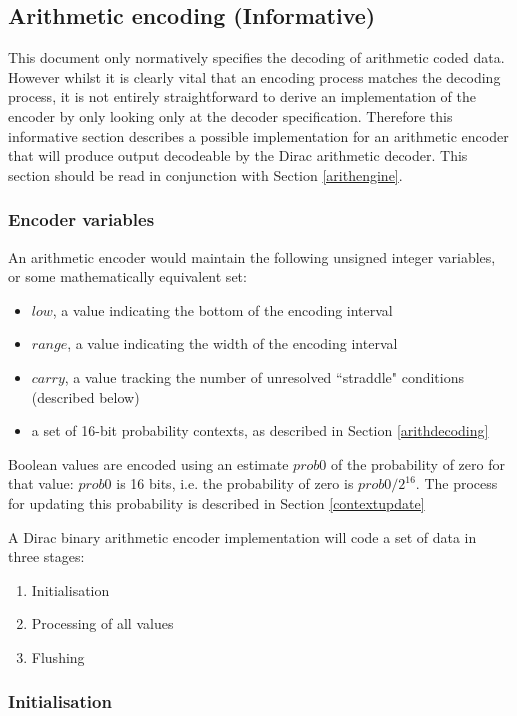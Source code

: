 \begin{informative*}
\subsection{Arithmetic encoding (Informative)}

This document only normatively specifies the decoding of arithmetic coded data. 
However whilst it is clearly vital that an encoding process matches the decoding
process, it is not entirely straightforward to derive an implementation of the
encoder by only looking only at the decoder specification. Therefore this
informative section describes a possible implementation for an
arithmetic encoder that will produce output decodeable by
the Dirac arithmetic decoder. This section should be read in conjunction with
Section \ref{arithengine}.

\subsubsection{Encoder variables}

An arithmetic encoder would maintain the following unsigned integer variables, or
some mathematically equivalent set:
\begin{itemize}
\item $low$, a value indicating the bottom of the encoding interval
\item $range$, a value indicating the width of the encoding interval
\item $carry$, a value tracking the number of unresolved ``straddle" conditions 
(described below)
\item a set of 16-bit probability contexts, as described in Section \ref{arithdecoding}
\end{itemize}

Boolean values are encoded using an estimate $prob0$ of the probability of zero
for that value: $prob0$ is 16 bits, i.e. the probability of zero is $prob0/2^{16}$. 
The process for updating this probability is described in Section \ref{contextupdate}

A Dirac binary arithmetic encoder implementation will code a set of data in three stages:
\begin{enumerate}
\item Initialisation
\item Processing of all values
\item Flushing
\end{enumerate}

\subsubsection{Initialisation}


\end{informative*}

